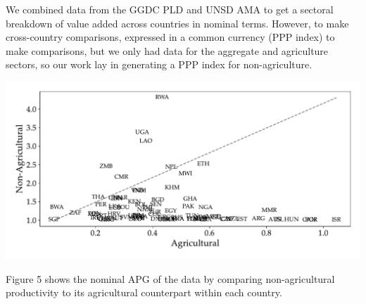 \documentclass[landscape,a0paper, fontscale = 0.285]{baposter} %
\begin{document}
\begin{poster}
{\begin{multicols}{2}
\columnbreak

We combined data from the GGDC PLD \cite{inklaar2024tradability} and
    UNSD AMA to get a sectoral
    breakdown of value added across countries in nominal terms. However, to make
    cross-country comparisons, 
    expressed in a common currency (PPP index) to make comparisons, but we only had data for the
    aggregate and agriculture sectors, so our work lay in generating a PPP index for
    non-agriculture. 


\begin{center}
\includegraphics[width=\linewidth]{nominalAPG.pdf}
\end{center}
Figure 5 shows the nominal APG of the data by comparing non-agricultural
productivity to its agricultural counterpart within each country. 
\end{multicols}
}



\end{poster}
\end{document}
